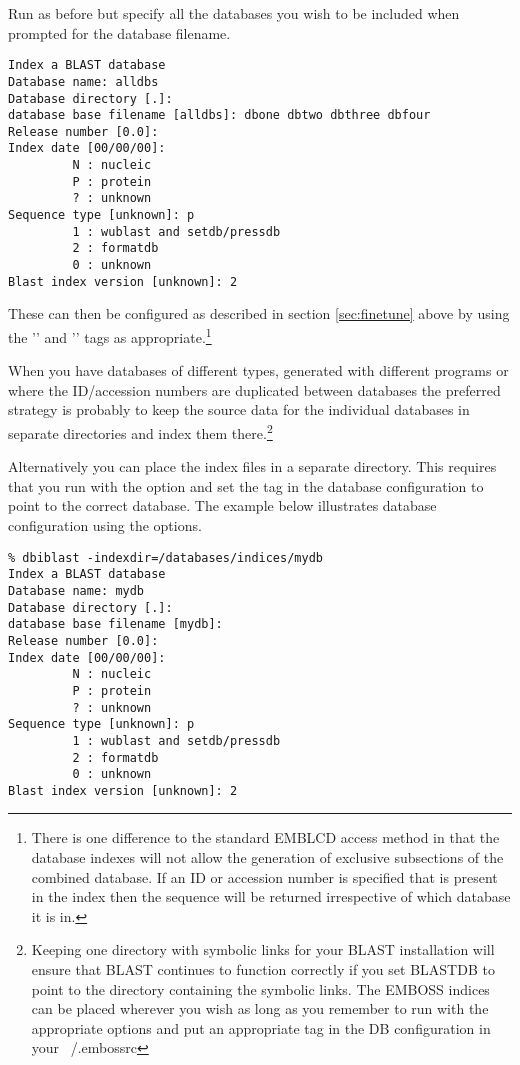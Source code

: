 \documentclass{report}
\begin{document}
Run  as before but specify all the databases you
wish to be included when prompted for the database filename.

\begin{verbatim}
Index a BLAST database
Database name: alldbs
Database directory [.]: 
database base filename [alldbs]: dbone dbtwo dbthree dbfour 
Release number [0.0]: 
Index date [00/00/00]: 
         N : nucleic
         P : protein
         ? : unknown
Sequence type [unknown]: p
         1 : wublast and setdb/pressdb
         2 : formatdb
         0 : unknown
Blast index version [unknown]: 2

\end{verbatim}

These can then be configured as described in section
\ref{sec:finetune} above by using the '' and
'' tags as appropriate.\footnote{There is one
difference to the standard EMBLCD access method in that the database
indexes will not allow the generation of exclusive subsections of the
combined database. If an ID or accession number is specified that is
present in the index then the sequence will be returned irrespective
of which database it is in.}

When you have databases of different types, generated with different
programs or where the ID/accession numbers are duplicated between
databases the preferred strategy is probably to keep the source data
for the individual databases in separate directories and index them
there.\footnote{Keeping one directory with symbolic links for your
BLAST installation will ensure that BLAST continues to function
correctly if you set BLASTDB to point to the directory containing the
symbolic links. The EMBOSS indices can be placed wherever you wish as
long as you remember to run  with the appropriate
options and put an appropriate  tag in the DB
configuration in your ~/.embossrc}

Alternatively you can place the index files in a separate
directory. This requires that you run  with the
 option and set the  tag in
the database configuration to point to the correct database. The
example below illustrates database configuration using the
 options.

\begin{verbatim}
% dbiblast -indexdir=/databases/indices/mydb
Index a BLAST database
Database name: mydb
Database directory [.]: 
database base filename [mydb]: 
Release number [0.0]: 
Index date [00/00/00]: 
         N : nucleic
         P : protein
         ? : unknown
Sequence type [unknown]: p
         1 : wublast and setdb/pressdb
         2 : formatdb
         0 : unknown
Blast index version [unknown]: 2

\end{verbatim}
\end{document}
